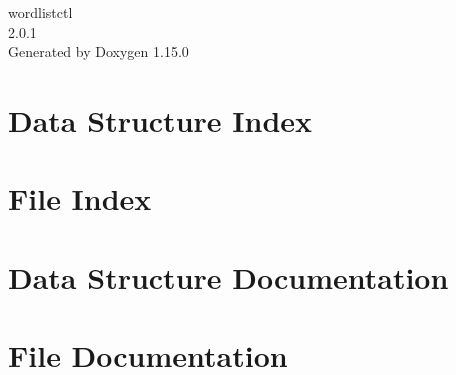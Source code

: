 \documentclass[twoside]{book}
\newcommand{\+}{\discretionary{\mbox{\scriptsize$\hookleftarrow$}}{}{}}
\newcommand{\clearemptydoublepage}{%
    \newpage{\pagestyle{empty}\cleardoublepage}%
  }
\begin{document}
  \raggedbottom
    \hypersetup{pageanchor=false,
                bookmarksnumbered=true,
                pdfencoding=unicode
               }
  \begin{titlepage}
  \vspace*{7cm}
  \begin{center}%
  {\Large wordlistctl}\\
  [1ex]\large 2.\+0.\+1 \\
  \vspace*{1cm}
  {\large Generated by Doxygen 1.15.0}\\
  \end{center}
  \end{titlepage}
  \clearemptydoublepage
  \tableofcontents
  \clearemptydoublepage
  \hypersetup{pageanchor=true}

\chapter{Data Structure Index}

\chapter{File Index}

\chapter{Data Structure Documentation}



\chapter{File Documentation}




  \backmatter
  \newpage
  \clearemptydoublepage
  \printindex
\end{document}
